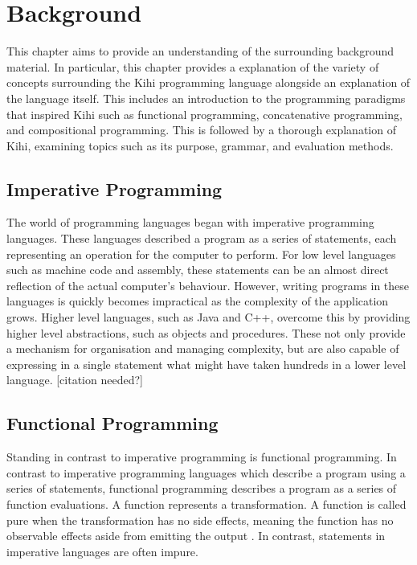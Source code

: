 \chapter{Background} \label{C:background}
This chapter aims to provide an understanding of the surrounding background material. In particular, this chapter provides a explanation of the variety of concepts surrounding the Kihi programming language alongside an explanation of the language itself. This includes an introduction to the programming paradigms that inspired Kihi such as functional programming, concatenative programming, and compositional programming. This is followed by a thorough explanation of Kihi, examining topics such as its purpose, grammar, and evaluation methods.

\section{Imperative Programming}
The world of programming languages began with imperative programming languages. These languages described a program as a series of statements, each representing an operation for the computer to perform. For low level languages such as machine code and assembly, these statements can be an almost direct reflection of the actual computer's behaviour. However, writing programs in these languages is quickly becomes impractical as the complexity of the application grows. Higher level languages, such as Java and C++, overcome this by providing higher level abstractions, such as objects and procedures. These not only provide a mechanism for organisation and managing complexity, but are also capable of expressing in a single statement what might have taken hundreds in a lower level language.
[citation needed?]


\section{Functional Programming}

Standing in contrast to imperative programming is functional programming. In contrast to imperative programming languages which describe a program using a series of statements, functional programming describes a program as a series of function evaluations. A function represents a transformation. A function is called pure when the transformation has no side effects, meaning the function has no observable effects aside from emitting the output \cite{FunctionalProgrammingHaskellWiki2019}. In contrast, statements in imperative languages are often impure.


